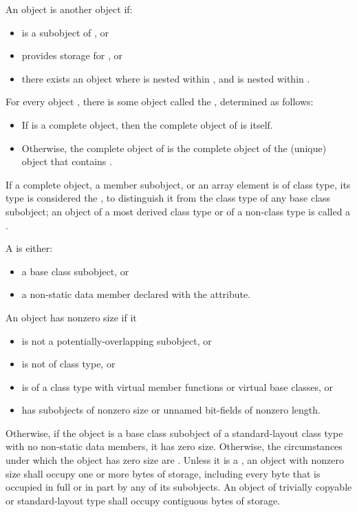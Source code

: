 \pnum
{}%
An object  is  another object  if:
\begin{itemize}
\item
{} is a subobject of , or
\item
{} provides storage for , or
\item
there exists an object 
where  is nested within ,
and  is nested within .
\end{itemize}

\pnum
For every object , there is some object called the
 , determined as follows:
\begin{itemize}
\item
If  is a complete object, then the complete object
of  is itself.

\item
Otherwise, the complete object of  is the complete object
of the (unique) object that contains .
\end{itemize}

\pnum
If a complete object, a member subobject, or an array element is of
class type, its type is considered the , to distinguish it from the class type of any base class subobject;
an object of a most derived class type or of a non-class type is called a
.

\pnum
A  is either:
\begin{itemize}
\item a base class subobject, or
\item a non-static data member
declared with the  attribute.
\end{itemize}

\pnum
{}%
%
An object has nonzero size if it
\begin{itemize}
\item is not a potentially-overlapping subobject, or
\item is not of class type, or
\item is of a class type with virtual member functions or virtual base classes, or
\item has subobjects of nonzero size or unnamed bit-fields of nonzero length.
\end{itemize}
Otherwise, if the object is a base class subobject
of a standard-layout class type
with no non-static data members,
it has zero size.
Otherwise, the circumstances under which the object has zero size
are .
%
Unless it is a ,
an object with nonzero size
shall occupy one or more bytes of storage,
including every byte that is occupied in full or in part
by any of its subobjects.
An object of trivially copyable or
standard-layout type shall occupy contiguous bytes of
storage.

